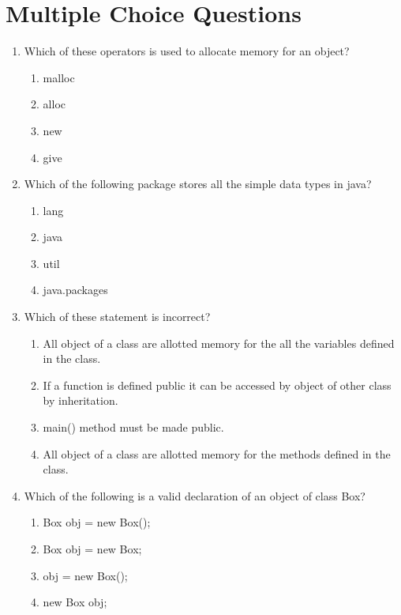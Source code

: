 \documentclass[11pt,a4paper]{article}
\begin{document}
\section*{Multiple Choice Questions}

\begin{enumerate}
    \item Which of these operators is used to allocate memory for an object?
        \begin{enumerate}
            \item malloc
            \item alloc
            \item new
            \item give
        \end{enumerate}

\item Which of the following package stores all the simple data types in java?
 \begin{enumerate}
            \item lang
            \item java
            \item util
            \item java.packages
        \end{enumerate}
        
\item Which of these statement is incorrect?
\begin{enumerate}
\item All object of a class are allotted memory for the all the variables defined in the class.
\item If a function is defined public it can be accessed by object of other class by inheritation.
\item main() method must be made public.
\item All object of a class are allotted memory for the methods defined in the class.
\end{enumerate}

\item Which of the following is a valid declaration of an object of class Box?
\begin{enumerate}
\item Box obj = new Box();
\item Box obj = new Box;
\item obj = new Box();
\item new Box obj;
    \end{enumerate}
    

\end{enumerate}
\end{document}
